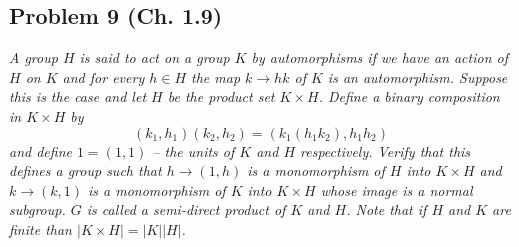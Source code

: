 \documentclass{article}
\begin{document}
\subsection*{Problem 9 (Ch. 1.9)}
{\it A group $H$ is said to \emph{act on a group $K$ by automorphisms}
if we have an action of $H$ on $K$
and for every $h \in H$ the map $k \to hk$ of $K$ is an automorphism.
Suppose this is the case and let $H$ be the product set $K \times H$.
Define a binary composition in $K \times H$ by
\[
	(k_1, h_1)(k_2, h_2) = (k_1(h_1k_2), h_1h_2)
\]
and define $1=(1,1)$ -- the units of $K$ and $H$ respectively.
Verify that this defines a group such that $h \to (1,h)$
is a monomorphism of $H$ into $K \times H$
and $k \to (k,1)$ is a monomorphism of $K$ into $K \times H$
whose image is a normal subgroup.
$G$ is called a \emph{semi-direct product of $K$ and $H$}.
Note that if $H$ and $K$ are finite than $|K \times H| = |K||H|$.}
\end{document}
